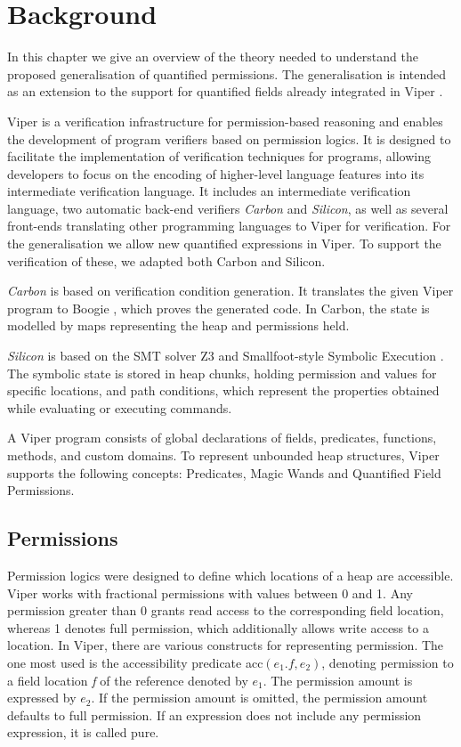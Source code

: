 \documentclass[12pt]{article}
\begin{document}

\section{Background}
\label{background}
In this chapter we give an overview of the theory needed to understand the proposed generalisation of quantified permissions. The generalisation is intended as an extension to the support for quantified fields already integrated in Viper \cite{viper}\cite{viper2014}.

Viper is a verification infrastructure for permission-based reasoning and enables the development of program verifiers based on permission logics. It is designed to facilitate the implementation of verification techniques for programs, allowing developers to focus on the encoding of higher-level language features into its intermediate verification language. It includes an intermediate verification language, two automatic back-end verifiers \textit{Carbon} and \textit{Silicon}, as well as several front-ends translating other programming languages to Viper for verification. For the generalisation we allow new quantified expressions in Viper. To support the verification of these, we adapted both Carbon and Silicon. 

\textit{Carbon}  is based on verification condition generation. It translates the given Viper program to Boogie \cite{leino2008boogie}, which proves the generated code.
In Carbon, the state is modelled by maps representing the heap and permissions held.

\textit{Silicon} is based on the SMT solver Z3 \cite{de2008z3} and Smallfoot-style Symbolic Execution \cite{berdine2005smallfoot}. The symbolic state is stored in heap chunks, holding permission and values for specific locations, and path conditions, which represent the properties obtained while evaluating or executing commands.

A Viper program consists of global declarations of fields, predicates, functions, methods, and custom domains. To represent unbounded heap structures, Viper supports the following concepts: Predicates, Magic Wands and Quantified Field Permissions.

\subsection{Permissions}
Permission logics were designed to define which locations of a heap are accessible. Viper works with fractional permissions with values between 0 and 1. Any permission greater than 0 grants read access to the corresponding field location, whereas 1 denotes full permission, which additionally allows write access to a location. 
In Viper, there are various constructs for representing permission. The one most used is the accessibility predicate acc\((e_1.f, e_2)\), denoting permission to a field location \textit{f} of the reference denoted by \(e_1\). The permission amount is expressed by \(e_2\). If the permission amount is omitted, the permission amount defaults to full permission. If an expression does not include any permission expression, it is called pure.
\end{document}
